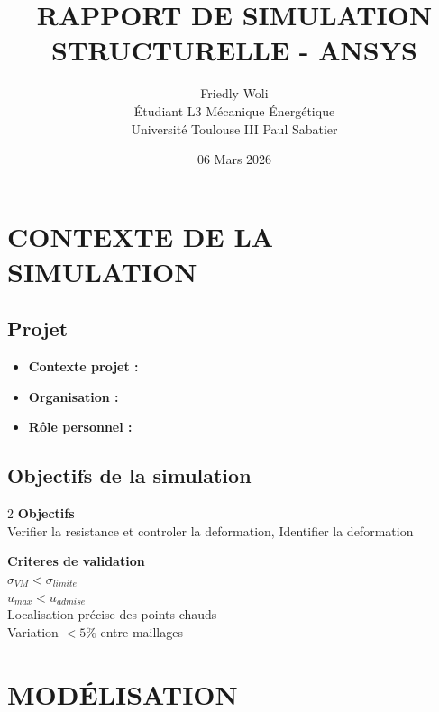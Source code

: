 \documentclass[12pt,a4paper]{article}
\title{\textbf{RAPPORT DE SIMULATION STRUCTURELLE - ANSYS}}
\author{Friedly Woli \\ Étudiant L3 Mécanique Énergétique \\ Université Toulouse III Paul Sabatier}
\date{06 Mars 2026}
\begin{document}
	
	\maketitle
	\tableofcontents
	\newpage
	
	\section{CONTEXTE DE LA SIMULATION}
	
			\subsection{Projet}
			\begin{itemize}
				\item \textbf{Contexte projet :} \dotfill %
				\item \textbf{Organisation :} \dotfill %
				\item \textbf{Rôle personnel :} \dotfill %
			\end{itemize}

			\subsection{Objectifs de la simulation}

			
				
				
				\begin{multicols}{2}
					\textbf{ Objectifs } \\
					Verifier la resistance et controler la deformation, Identifier la deformation 
					
					\columnbreak
					
					\textbf{Criteres de validation }\\
					$\sigma_{VM} < \sigma_{limite}$ \\
					$u_{max} < u_{admise}$ \\
					Localisation précise des points chauds \\
					Variation $< 5\%$ entre maillages \\
				\end{multicols}
				
			
	\newpage
	
	
	
	
	\section{MODÉLISATION}
	
\end{document}
